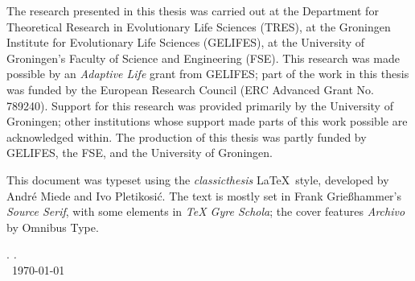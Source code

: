 \thispagestyle{empty}

\hfill

\vfill


\noindent The research presented in this thesis was carried out at the Department for Theoretical Research in Evolutionary Life Sciences (TRES), at the Groningen Institute for Evolutionary Life Sciences (GELIFES), at the University of Groningen's Faculty of Science and Engineering (FSE).
This research was made possible by an \emph{Adaptive Life} grant from GELIFES; part of the work in this thesis was funded by the European Research Council (ERC Advanced Grant No. 789240).
Support for this research was provided primarily by the University of Groningen; other institutions whose support made parts of this work possible are acknowledged within.
The production of this thesis was partly funded by GELIFES, the FSE, and the University of Groningen.

\medskip

\noindent This document was typeset using the \emph{classicthesis} \LaTeX~style, developed by Andr\'e Miede and Ivo Pletikosić.
The text is mostly set in Frank Grie{\ss}hammer's \emph{Source Serif}, with some elements in \emph{TeX Gyre Schola}; the cover features \emph{Archivo} by Omnibus Type.

\bigskip

\noindent\finalVersionString

\noindent\myName. \textit{\myTitle.}%
\\
\noindent \textcopyright\ \today
